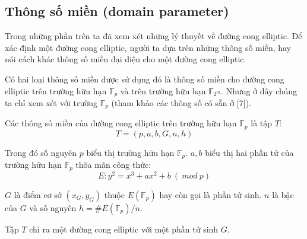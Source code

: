 \documentclass[a4paper,12pt]{report}
\begin{document}
\subsection*{Thông số miền (domain parameter)}
Trong những phần trên ta đã xem xét những lý thuyết về đường cong elliptic. Để xác định một đường cong elliptic, người ta dựa trên những thông số miền, hay nói cách khác thông số miền đại diện cho một đường cong elliptic.

Có hai loại thông số miền được sử dụng đó là thông số miền cho đường cong elliptic trên trường hữu hạn $\mathbb{F}_p$ và trên trường hữu hạn $\mathbb{F}_{2^m}$. Nhưng ở đây chúng ta chỉ xem xét với trường $\mathbb{F}_p$ (tham khảo các thông số có sẵn ở [7]).

Các thông số miền của đường cong elliptic trên trường hữu hạn $\mathbb{F}_p$ là tập $T$:
\begin{displaymath}
T = (p, a, b, G, n, h)
\end{displaymath}

Trong đó số nguyên $p$ biểu thị trường hữu hạn $\mathbb{F}_p$. $a , b$ biểu thị hai phần tử của trường hữu hạn $\mathbb{F}_p$ thõa mãn công thức:
\begin{displaymath}
E: y^2 = x^3 + ax^2 + b \ (\ mod \ p)
\end{displaymath}

$G$ là điểm cơ sở $(x_G, y_G)$ thuộc $E(\mathbb{F}_p)$ hay còn gọi là phần tử sinh. $n$ là bậc của $G$ và số nguyên $h = \#E(\mathbb{F}_p)/n$.

Tập $T$ chỉ ra một đường cong elliptic với một phần tử sinh $G$.
\end{document}
